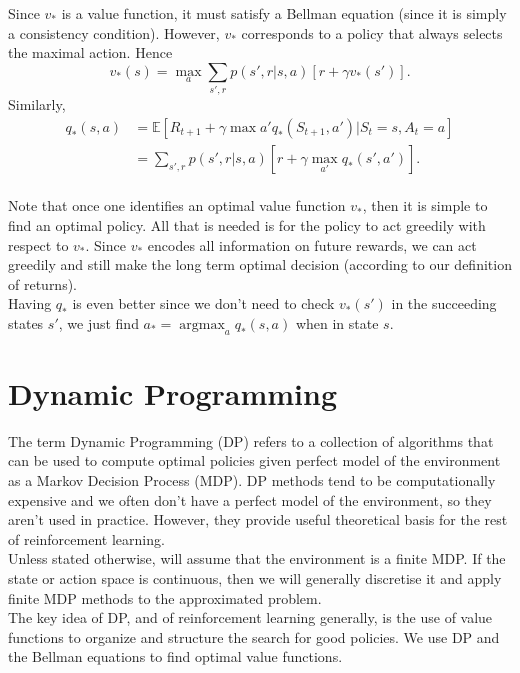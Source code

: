 \documentclass[a4paper, oneside, 11pt]{article}
\newcommand\argmax{\operatorname*{argmax}}
\begin{document}
Since $v_*$ is a value function, it must satisfy a Bellman equation (since it is simply a consistency condition). However, $v_*$ corresponds to a policy that always selects the maximal action. Hence 
\begin{equation}
    v_*(s) = \max_a \sum_{s', r} p(s', r|s, a) [r + \gamma v_*(s')].
\end{equation}
Similarly,
\begin{align}
    q_*(s, a) &= \mathbb{E} [R_{t+1} + \gamma \max{a'}q_*(S_{t+1}, a') | S_t=s, A_t = a]\\
              &= \sum_{s', r} p(s', r| s, a ) [r + \gamma \max_{a'}q_*(s', a')].
\end{align} \\

Note that once one identifies an optimal value function $v_*$, then it is simple to find an optimal policy. All that is needed is for the policy to act greedily with respect to $v_*$. Since $v_*$ encodes all information on future rewards, we can act greedily and still make the long term optimal decision (according to our definition of returns).\\

Having $q_*$ is even better since we don't need to check $v_*(s')$ in the succeeding states $s'$, we just find $a_* = \argmax_a q_*(s, a)$ when in state $s$.


\section{Dynamic Programming}

The term Dynamic Programming (DP) refers to a collection of algorithms that can be used to compute optimal policies given perfect model of the environment as a Markov Decision Process (MDP). DP methods tend to be computationally expensive and we often don't have a perfect model of the environment, so they aren't used in practice. However, they provide useful theoretical basis for the rest of reinforcement learning. \\

Unless stated otherwise, will assume that the environment is a finite MDP. If the state or action space is continuous, then we will generally discretise it and apply finite MDP methods to the approximated problem.\\

The key idea of DP, and of reinforcement learning generally, is the use of value functions to organize and structure the search for good policies. We use DP and the Bellman equations to find optimal value functions. 
\end{document}
